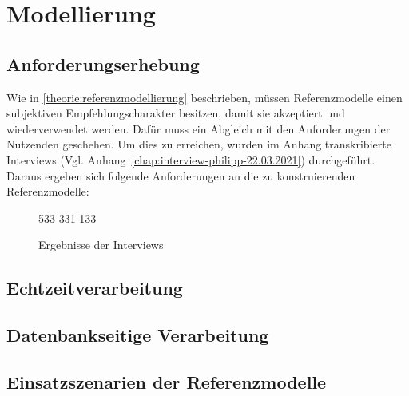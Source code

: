 \chapter{Modellierung}
\section{Anforderungserhebung}
Wie in \autoref{theorie:referenzmodellierung} beschrieben, müssen Referenzmodelle einen subjektiven Empfehlungscharakter besitzen, damit sie akzeptiert und wiederverwendet werden. Dafür muss ein Abgleich mit den Anforderungen der Nutzenden geschehen. Um dies zu erreichen, wurden im Anhang transkribierte Interviews (Vgl. Anhang~\ref{chap:interview-philipp-22.03.2021})  durchgeführt. Daraus ergeben sich folgende Anforderungen an die zu konstruierenden Referenzmodelle:



\begin{figure}[H]
\centering
\spideroverview
{5}{3}{3}
{3}{3}{1}
{1}{3}{3}
\caption{Ergebnisse der Interviews}
\label{abb:DimensionenUebersicht}
\end{figure}
\section{Echtzeitverarbeitung}

\section{Datenbankseitige Verarbeitung}

\section{Einsatzszenarien der Referenzmodelle}